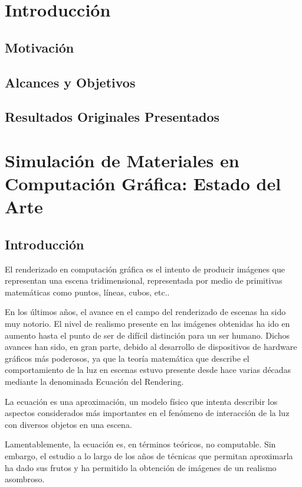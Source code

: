 \documentclass[spanish,a4paper,openright,11pt]{book}
\begin{document}
\newpage

\chapter{Introducción}
\section{Motivación}
\section{Alcances y Objetivos}
\section{Resultados Originales Presentados}

\chapter{Simulación de Materiales en Computación Gráfica: Estado del Arte}
\section{Introducción} %
El renderizado en computación gráfica es el intento de producir imágenes que representan una escena tridimensional, representada por medio de primitivas matemáticas como puntos, líneas, cubos, etc..

En los últimos años, el avance en el campo del renderizado de escenas ha sido muy notorio. El nivel de realismo presente en las imágenes obtenidas ha ido en aumento hasta el punto de ser de difícil distinción para un ser humano. Dichos avances han sido, en gran parte, debido al desarrollo de dispositivos de hardware gráficos más poderosos, ya que la teoría matemática que describe el comportamiento de la luz en escenas estuvo presente desde hace varias décadas \cite{Kajiya} mediante la denominada Ecuación del Rendering.


La ecuación es una aproximación, un modelo físico que intenta describir los aspectos considerados más importantes en el fenómeno de interacción de la luz con diversos objetos en una escena.

Lamentablemente, la ecuación es, en términos teóricos, no computable. Sin embargo, el estudio a lo largo de los años de técnicas que permitan aproximarla ha dado sus frutos y ha permitido la obtención de imágenes de un realismo asombroso.
\end{document}

